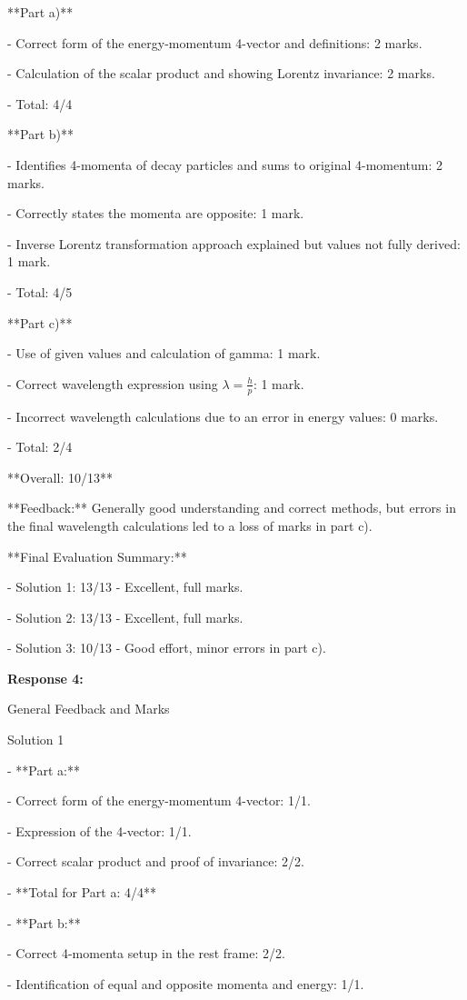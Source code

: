 \documentclass[a4paper,11pt]{article}
\begin{document}
**Part a)**

- Correct form of the energy-momentum 4-vector and definitions: 2 marks.

- Calculation of the scalar product and showing Lorentz invariance: 2 marks.

- Total: 4/4

**Part b)**

- Identifies 4-momenta of decay particles and sums to original 4-momentum: 2 marks.

- Correctly states the momenta are opposite: 1 mark.

- Inverse Lorentz transformation approach explained but values not fully derived: 1 mark.

- Total: 4/5

**Part c)**

- Use of given values and calculation of gamma: 1 mark.

- Correct wavelength expression using \( \lambda = \frac{h}{p} \): 1 mark.

- Incorrect wavelength calculations due to an error in energy values: 0 marks.

- Total: 2/4

**Overall: 10/13**

**Feedback:** Generally good understanding and correct methods, but errors in the final wavelength calculations led to a loss of marks in part c).

**Final Evaluation Summary:**

- Solution 1: 13/13 - Excellent, full marks.

- Solution 2: 13/13 - Excellent, full marks.

- Solution 3: 10/13 - Good effort, minor errors in part c).

\bigskip
\textbf{Response 4:}

General Feedback and Marks

Solution 1

- **Part a:**

  - Correct form of the energy-momentum 4-vector: 1/1.
  
  - Expression of the 4-vector: 1/1.
  
  - Correct scalar product and proof of invariance: 2/2.
  
  - **Total for Part a: 4/4**

- **Part b:**

  - Correct 4-momenta setup in the rest frame: 2/2.
  
  - Identification of equal and opposite momenta and energy: 1/1.
  
\end{document}
